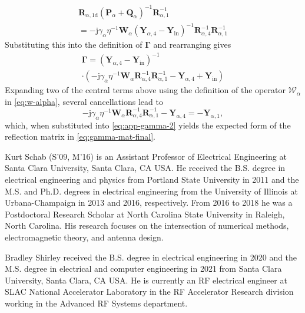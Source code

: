 \documentclass[article]{IEEEtran}
\newcommand{\M}[1]{\mathbf{#1}}
\newcommand{\T}[1]{\mathrm{#1}}
\newcommand{\Xopchar}{P}
\newcommand{\Yopchar}{Q}
\newcommand{\Xmat}{\mathbf{\Xopchar}}
\newcommand{\Ymat}{\mathbf{\Yopchar}}
\begin{document}
\begin{multline}
    \M{R}_{\alpha,1\T{d}}\left(\Xmat_\alpha+\Ymat_\alpha\right)^{-1}\M{R}_{\alpha,1}^{-1} \\= -\T{j}\gamma_\alpha \eta^{-1}\M{W}_\alpha(\M{Y}_{\alpha,4}-\M{Y}_\T{in})^{-1}\M{R}_{\alpha,4}^{-1}\M{R}_{\alpha,1}^{-1}
\end{multline}
Substituting this into the definition of $\M{\Gamma}$ and rearranging gives
\begin{multline}
    \M{\Gamma} = 
    (\M{Y}_{\alpha,4}-\M{Y}_\T{in})^{-1}\\\cdot
    \left(-\T{j}\gamma_\alpha \eta^{-1}\M{W}_\alpha \M{R}_{\alpha,4}^{-1}\M{R}_{\alpha,1}^{-1} - \M{Y}_{\alpha,4}+\M{Y}_\T{in}\right)
    \label{eq:app-gamma-2}
\end{multline}
Expanding two of the central terms above using the definition of the operator $\mathcal{W}_\alpha$ in \eqref{eq:w-alpha}, several cancellations lead to
\begin{equation}
    -\T{j}\gamma_\alpha \eta^{-1} \M{W}_\alpha\M{R}_{\alpha,4}^{-1}\M{R}_{\alpha,1}^{-1} - \M{Y}_{\alpha,4} = -\M{Y}_{\alpha,1},
\end{equation}
which, when substituted into \eqref{eq:app-gamma-2} yields the expected form of the reflection matrix in \eqref{eq:gamma-mat-final}.





\begin{IEEEbiography}{Kurt Schab}
(S'09, M'16) is an Assistant Professor of Electrical Engineering at Santa Clara University, Santa Clara, CA USA. He received the B.S. degree in electrical engineering and physics from Portland State University in 2011 and the M.S. and Ph.D. degrees in electrical engineering from the University of Illinois at Urbana-Champaign in 2013 and 2016, respectively.  From 2016 to 2018 he was a Postdoctoral Research Scholar at North Carolina State University in Raleigh, North Carolina.  His research focuses on the intersection of numerical methods, electromagnetic theory, and antenna design.  
\end{IEEEbiography}

\begin{IEEEbiography}{Bradley Shirley} received the B.S. degree in electrical engineering in 2020 and the M.S. degree in electrical and computer engineering in 2021 from Santa Clara University, Santa Clara, CA USA. He is currently an RF electrical engineer at SLAC National Accelerator Laboratory in the RF Accelerator Research division working in the Advanced RF Systems department. 
\end{IEEEbiography}
\end{document}
